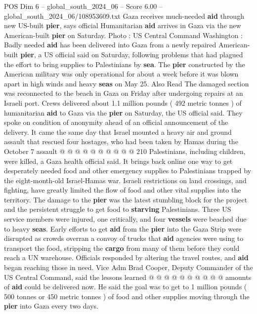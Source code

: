 \begin{textsample}{POS Dim 6 – global\_south\_2024\_06 – Score 6.00 – global\_south\_2024\_06/108953609.txt}  \label{ex:f6_pos_178}
Gaza receives much-needed \textbf{aid} through new US-built \textbf{pier}, says official Humanitarian \textbf{aid} arrives in Gaza via the new American-built \textbf{pier} on Saturday.
Photo : US Central Command Washington : Badly needed \textbf{aid} has been delivered into Gaza from a newly repaired American-built \textbf{pier}, a US official said on Saturday, following problems that had plagued the effort to bring supplies to Palestinians by \textbf{sea}.
The \textbf{pier} constructed by the American military was only operational for about a week before it was blown apart in high winds and heavy \textbf{seas} on May 25.
Also Read The damaged section was reconnected to the beach in Gaza on Friday after undergoing repairs at an Israeli port.
Crews delivered about 1.1 million pounds ( 492 metric tonnes ) of humanitarian \textbf{aid} to Gaza via the \textbf{pier} on Saturday, the US official said.
They spoke on condition of anonymity ahead of an official announcement of the delivery.
It came the same day that Israel mounted a heavy air and ground assault that rescued four hostages, who had been taken by Hamas during the October 7 assault @ @ @ @ @ @ @ @ @ @ 210 Palestinians, including children, were killed, a Gaza health official said.
It brings back online one way to get desperately needed food and other emergency supplies to Palestinians trapped by the eight-month-old Israel-Hamas war.
Israeli restrictions on land crossings, and fighting, have greatly limited the flow of food and other vital supplies into the territory.
The damage to the \textbf{pier} was the latest stumbling block for the project and the persistent struggle to get food to \textbf{starving} Palestinians.
Three US service members were injured, one critically, and four \textbf{vessels} were beached due to heavy \textbf{seas}.
Early efforts to get \textbf{aid} from the \textbf{pier} into the Gaza Strip were disrupted as crowds overran a convoy of trucks that \textbf{aid} agencies were using to transport the food, stripping the \textbf{cargo} from many of them before they could reach a UN warehouse.
Officials responded by altering the travel routes, and \textbf{aid} began reaching those in need.
Vice Adm Brad Cooper, Deputy Commander of the US Central Command, said the lessons learned @ @ @ @ @ @ @ @ @ @ amounts of \textbf{aid} could be delivered now.
He said the goal was to get to 1 million pounds ( 500 tonnes or 450 metric tonnes ) of food and other supplies moving through the \textbf{pier} into Gaza every two days.

\end{textsample}
